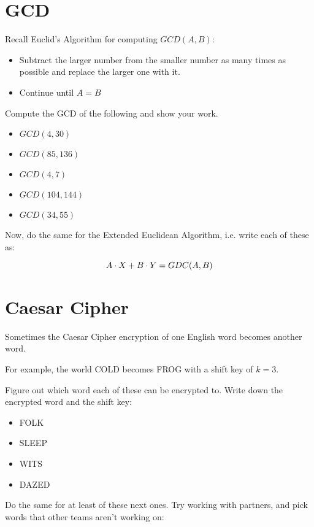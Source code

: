 \documentclass[12pt]{article}
\begin{document}
 

\section{GCD}


Recall Euclid's Algorithm for computing $GCD(A, B)$:

\begin{itemize}
\item Subtract the larger number from the smaller number as many times as possible and replace the larger one with it.
\item Continue until $A = B$
\end{itemize}

Compute the GCD of the following and show your work.

\begin{itemize}
\item $GCD(4, 30)$
\item $GCD(85, 136)$
\item $GCD(4, 7)$
\item $GCD(104, 144)$
\item $GCD(34, 55)$
\end{itemize}

Now, do the same for the Extended Euclidean Algorithm, i.e. write each of these as:

$$
A \cdot X + B \cdot Y = GDC(A, B)
$$

\section{Caesar Cipher}

Sometimes the Caesar Cipher encryption of one English word becomes another word.

For example, the world COLD becomes FROG with a shift key of $k = 3$.

Figure out which word each of these can be encrypted to. Write down the encrypted word and the shift key:

\begin{itemize}
\item FOLK 
\item SLEEP 
\item WITS 
\item DAZED 
\end{itemize}

Do the same for at least  of these next ones. Try working with partners, and pick words that other teams aren't working on:
\end{document}
